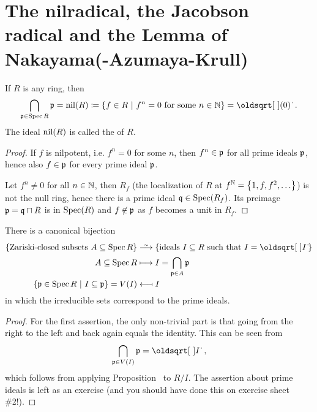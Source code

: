 \documentclass[a4paper,parskip=half,numbers=enddot, DIV=12]{scrreprt}
\begin{document}
\section{The nilradical, the Jacobson radical and the Lemma of Nakayama(-Azumaya-Krull)}

\begin{prop}
    If $R$ is any ring, then 
    \begin{align*}
    	\bigcap_{\substack{\pp\in\Spec R\\}} \pp =\nil(R) \coloneqq \left\{f\in R\st f^n=0 \text{ for some } n\in\IN\right\} = \sqrt{(0)}\;.
    \end{align*}
    The ideal $\operatorname{nil}(R)$ is called the  of $R$.
\end{prop}
\begin{proof}
    If $f$ is nilpotent, i.e. $f^n=0$ for some $n$, then $f^n\in\mathfrak{p}$ for all prime ideals $\mathfrak{p}$, hence also $f\in\mathfrak{p}$ for every prime ideal $\mathfrak{p}$. 
    
    Let $f^n\neq 0$ for all $n\in \mathbb{N}$, then $R_f$ (the localization of $R$ at $f^{\mathbb{N}}=\left\{1,f,f^2,\ldots\right\}$) is not the null ring, hence there is a prime ideal $\mathfrak{q}\in\operatorname{Spec}(R_f)$. Its preimage $\mathfrak{p}=\mathfrak{q}\sqcap R$ is in $\operatorname{Spec}(R)$ and $f\not \in\mathfrak{p}$ as $f$ becomes a unit in $R_f$.
\end{proof}
\begin{cor}
    There is a canonical bijection 
    \begin{align*}
	    \left\{\text{Zariski-closed subsets }A\subseteq \Spec R\right\}&\isomorphism \left\{\text{ideals }I\subseteq R\text{ such that }I=\sqrt{I}\right\}\\
        A \subseteq \Spec R &\longmapsto I = \bigcap_{\pp\in A} \pp\\
        \left\{\pp\in \Spec R\st I\subseteq \pp\right\}=V(I)&\longmapsfrom I
    \end{align*}
    in which the irreducible sets correspond to the prime ideals.
\end{cor}
\begin{proof}
    For the first assertion, the only non-trivial part is that going from the right to the left and back again equals the identity. This can be seen from 
    \begin{align}\lbl{eq:PrimeCapRadical}
        \bigcap_{\pp\in V(I)}\pp = \sqrt{I}\;,
    \end{align}
    which follows from applying Proposition~ to $R/I$. The assertion about prime ideals is left as an exercise (and you should have done this on exercise sheet \#2!).
\end{proof}
\end{document}
